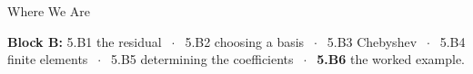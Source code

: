 

\graphicspath{{./figures/}}





\makedecktitle

\begin{frame}{Where We Are}
\vspace{-1mm}
\begin{center}
\small \textbf{Block B:} 5.B1 the residual $\;\cdot\;$ 5.B2 choosing a basis $\;\cdot\;$ 5.B3 Chebyshev $\;\cdot\;$ 5.B4 finite elements $\;\cdot\;$ 5.B5 determining the coefficients $\;\cdot\;$ \textbf{5.B6} the worked example.
\end{center}
\end{frame}


